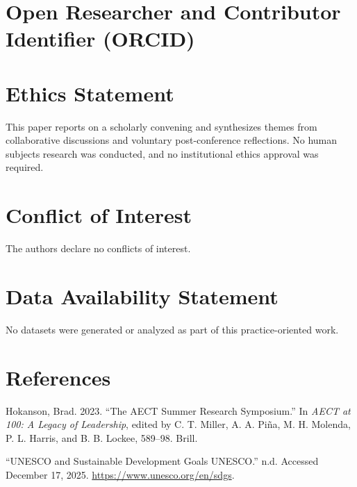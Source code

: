 \documentclass[
  letterpaper,
  DIV=11,
  numbers=noendperiod]{scrartcl}
\newlength{\cslhangindent}
\newenvironment{CSLReferences}[2] %
 {\begin{list}{}{%
  \setlength{\itemindent}{0pt}
  \setlength{\leftmargin}{0pt}
  \setlength{\parsep}{0pt}
  \ifodd #1
   \setlength{\leftmargin}{\cslhangindent}
   \setlength{\itemindent}{-1\cslhangindent}
  \fi
  \setlength{\itemsep}{#2\baselineskip}}}
 {\end{list}}
\begin{document}
\section{Open Researcher and Contributor Identifier
(ORCID)}\label{open-researcher-and-contributor-identifier-orcid}

\section{Ethics Statement}\label{ethics-statement}

This paper reports on a scholarly convening and synthesizes themes from
collaborative discussions and voluntary post-conference reflections. No
human subjects research was conducted, and no institutional ethics
approval was required.

\section{Conflict of Interest}\label{conflict-of-interest}

The authors declare no conflicts of interest.

\section{Data Availability Statement}\label{data-availability-statement}

No datasets were generated or analyzed as part of this practice-oriented
work.

\section*{References}\label{references}

\label{refs}
\begin{CSLReferences}{1}{0}
Hokanson, Brad. 2023. {``The {AECT} Summer Research Symposium.''} In
\emph{{AECT} at 100: {A} Legacy of Leadership}, edited by C. T. Miller,
A. A. Piña, M. H. Molenda, P. L. Harris, and B. B. Lockee, 589--98.
Brill.

{``{UNESCO} and {Sustainable Development Goals} \textbar{} {UNESCO}.''}
n.d. Accessed December 17, 2025. \url{https://www.unesco.org/en/sdgs}.

\end{CSLReferences}
\end{document}
